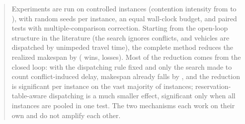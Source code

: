 \begin{abstract}
Experiments are run on \NCases{} controlled instances (contention intensity from \ContentionLo{} to \ContentionHi{}), with \NSeeds{} random seeds per instance, an equal wall-clock budget, and paired tests with multiple-comparison correction.
Starting from the open-loop structure in the literature (the search ignores conflicts, and vehicles are dispatched by unimpeded travel time), the complete method reduces the realized makespan by \GainEndToEnd{} (\WinEndToEnd{} wins, \LoseEndToEnd{} losses).
Most of the reduction comes from the closed loop: with the dispatching rule fixed and only the search made to count conflict-induced delay, makespan already falls by \GainLoopRule{}, and the reduction is significant per instance on the vast majority of instances; reservation-table-aware dispatching is a much smaller effect, significant only when all instances are pooled in one test. The two mechanisms each work on their own and do not amplify each other.
\end{abstract}

%


\author{Qi Yu}
\author{Wei Li}


